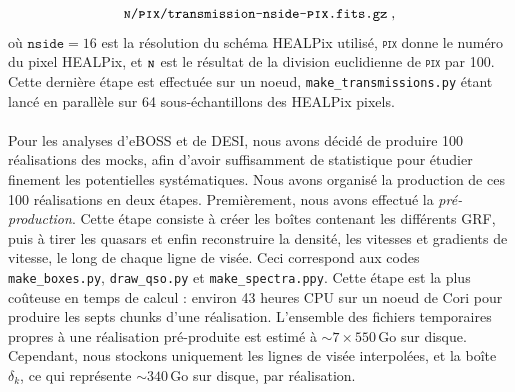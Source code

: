 \documentclass[11pt, twoside, a4paper, openright]{report}
\begin{document}
\begin{equation*}
  \texttt{\textsc{n}/\textsc{pix}/transmission-nside-\textsc{pix}.fits.gz} \; ,
\end{equation*}
où $\texttt{nside} = \num{16}$ est la résolution du schéma HEALPix utilisé, \texttt{\textsc{pix}} donne le numéro du pixel HEALPix, et $\texttt{\textsc{n}}$ est le résultat de la division euclidienne de \texttt{\textsc{pix}} par \num{100}.
Cette dernière étape est effectuée sur un noeud, \texttt{make\_transmissions.py} étant lancé en parallèle sur 64 sous-échantillons des HEALPix pixels.


\paragraph{}
Pour les analyses \lya{} d'eBOSS et de DESI, nous avons décidé de produire \num{100} réalisations des mocks, afin d'avoir suffisamment de statistique pour étudier finement les potentielles systématiques. Nous avons organisé la production de ces 100 réalisations en deux étapes. Premièrement, nous avons effectué la \emph{pré-production}. Cette étape consiste à créer les boîtes contenant les différents GRF, puis à tirer les quasars et enfin reconstruire la densité, les vitesses et gradients de vitesse, le long de chaque ligne de visée. Ceci correspond aux codes \texttt{make\_boxes.py}, \texttt{draw\_qso.py} et \texttt{make\_spectra.ppy}. Cette étape est la plus coûteuse en temps de calcul : environ 43 heures CPU sur un noeud de Cori pour produire les septs chunks d'une réalisation. L'ensemble des fichiers temporaires propres à une réalisation pré-produite est estimé à $\sim 7 \times \num{550}\,\mathrm{Go}$ sur disque. Cependant, nous stockons uniquement les lignes de visée interpolées, et la boîte $\delta_k$, ce qui représente $\sim \num{340}\,\mathrm{Go}$ sur disque, par réalisation.
\end{document}
